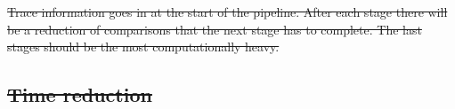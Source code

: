 \documentclass[11pt
              , a4paper
              , twoside
              , openright
              ]{report}
\providecommand{\DIFdel}[1]{{\protect\color{red}\sout{#1}}}                      %
\providecommand{\DIFdelbegin}{} %
\begin{document}
\DIFdelbegin %
{%
\DIFdel{Trace information goes in at the start of the pipeline. After each stage there will be a reduction of comparisons that the next stage has to complete. The last stages should be the most computationally heavy.}}

\subsection{\DIFdel{Time reduction}}
\addtocounter{subsection}{-1}%

\end{document}
